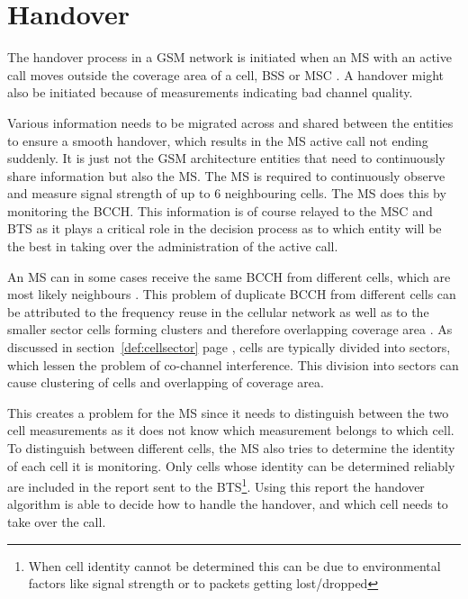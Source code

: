 \section{Handover}
\label{sec:handover}
The handover process in a GSM network is initiated when an MS with an active call moves outside the coverage area of a cell, BSS or MSC \cite{GSMArchitectureProtocolsServices,wirelesstelcoMullet,Eisenblatter}. A handover might also be initiated because of measurements indicating bad channel quality\cite{GSMArchitectureProtocolsServices}. 

Various information needs to be migrated across and shared between the entities to ensure a smooth handover, which results in the MS active call not ending suddenly. It is just not the GSM architecture entities that need to continuously share information but also the MS\@. The MS is required to continuously observe and measure signal strength of up to 6 neighbouring cells. The MS does this by monitoring the BCCH\cite{GSMArchitectureProtocolsServices,wirelesstelcoMullet}. This information is of course relayed to the MSC and BTS as it plays a critical role in the decision process as to which entity will be the best in taking over the administration of the active call\cite{GSMArchitectureProtocolsServices,wirelesstelcoMullet}.

An MS can in some cases receive the same BCCH from different cells, which are most likely neighbours \cite{GSMArchitectureProtocolsServices}. This problem of duplicate BCCH from different cells can be attributed to the frequency reuse in the cellular network as well as to the smaller sector cells forming clusters and therefore overlapping coverage area \cite{GSMArchitectureProtocolsServices}. As discussed in section~\ref{def:cellsector} page \pageref{def:cellsector}, cells are typically divided into sectors, which lessen the problem of co-channel interference. This division into sectors can cause clustering of cells and overlapping of coverage area.

This creates a problem for the MS since it needs to distinguish between the two cell measurements as it does not know which measurement belongs to which cell\cite{GSMArchitectureProtocolsServices}. To distinguish between different cells, the MS also tries to determine the identity of each cell it is monitoring. Only cells whose identity can be determined reliably are included in the report sent to the BTS\cite{Eisenblatter,GSMArchitectureProtocolsServices,wirelesstelcoMullet}\footnote{When cell identity cannot be determined this can be due to environmental factors like signal strength or to packets getting lost/dropped}. Using this report the handover algorithm is able to decide how to handle the handover, and which cell needs to take over the call\cite{Eisenblatter,GSMArchitectureProtocolsServices,wirelesstelcoMullet}.

